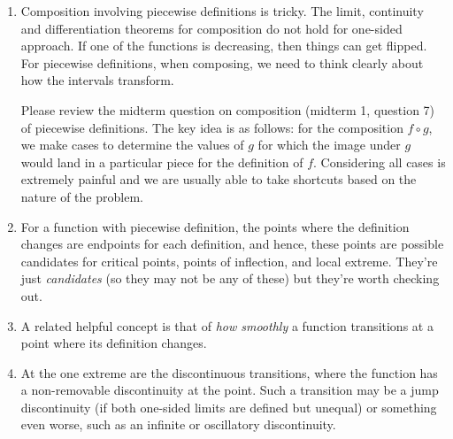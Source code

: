 \documentclass[10pt]{amsart}
\begin{document}
\begin{enumerate}
\item Composition involving piecewise definitions is tricky. The
  limit, continuity and differentiation theorems for composition do
  not hold for one-sided approach. If one of the functions is
  decreasing, then things can get flipped. For piecewise definitions,
  when composing, we need to think clearly about how the intervals
  transform.

  Please review the midterm question on composition (midterm 1,
  question 7) of piecewise definitions. The key idea is as follows:
  for the composition $f \circ g$, we make cases to determine the
  values of $g$ for which the image under $g$ would land in a
  particular piece for the definition of $f$. Considering all cases is
  extremely painful and we are usually able to take shortcuts based on
  the nature of the problem.
\item For a function with piecewise definition, the points where the
  definition changes are endpoints for each definition, and hence,
  these points are possible candidates for critical points, points of
  inflection, and local extreme. They're just {\em candidates} (so
  they may not be any of these) but they're worth checking out.
\item A related helpful concept is that of {\em how smoothly} a
  function transitions at a point where its definition changes. 
\item At the one extreme are the discontinuous transitions, where the
  function has a non-removable discontinuity at the point. Such a
  transition may be a jump discontinuity (if both one-sided limits are
  defined but unequal) or something even worse, such as an infinite or
  oscillatory discontinuity.


\end{enumerate}
\end{document}

